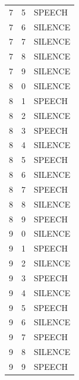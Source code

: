\documentclass[12pt]{article} %
\begin{document}
\begin{center}
\begin{longtable}{ccl}
7&5  &SPEECH\\
7&6  &SILENCE\\
7&7  &SILENCE\\
7&8  &SILENCE\\
7&9  &SILENCE\\
8&0  &SILENCE\\
8&1  &SPEECH\\
8&2  &SILENCE\\
8&3  &SPEECH\\
8&4  &SILENCE\\
8&5  &SPEECH\\
8&6  &SILENCE\\
8&7  &SPEECH\\
8&8  &SILENCE\\
8&9  &SPEECH\\
9&0  &SILENCE\\
9&1  &SPEECH\\
9&2  &SILENCE\\
9&3  &SPEECH\\
9&4  &SILENCE\\
9&5  &SPEECH\\
9&6  &SILENCE\\
9&7  &SPEECH\\
9&8  &SILENCE\\
9&9  &SPEECH\\
\end{longtable}
\end{center}

\newpage


\newpage
 
\end{document}
